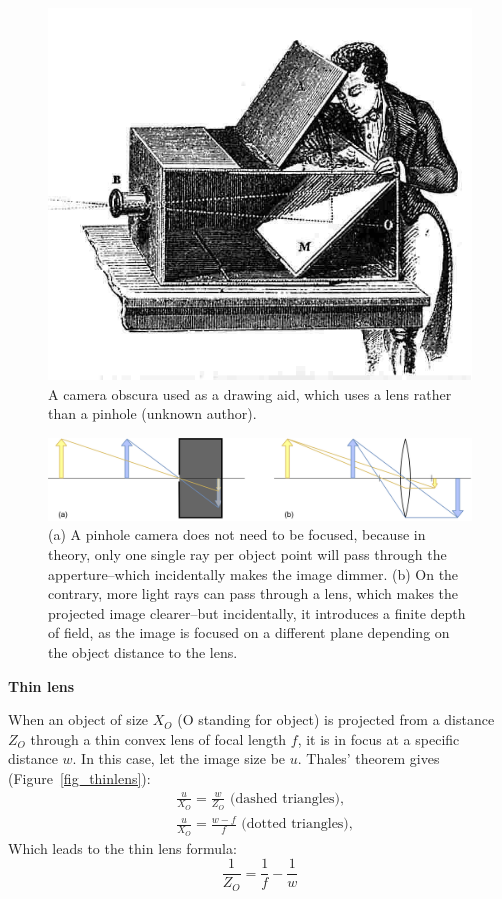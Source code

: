 \begin{figure}[hbtp]
	\centering
	\def\svgwidth{\columnwidth}
	\fontsize{10pt}{10pt}\selectfont
	\includegraphics[width=0.8\linewidth]{"../Chap2/Figures/Camera_Obscura.jpg"}
	\caption{A camera obscura used as a drawing aid, which uses a lens rather than a pinhole (unknown author). } 
	\label{fig_camobscura}
\end{figure}

\begin{figure}[hbtp]
	\centering
	\def\svgwidth{\columnwidth}
	\fontsize{10pt}{10pt}\selectfont
	\includegraphics[width=1\linewidth]{"../Chap2/Figures/Pinhole_Lens.png"}
	\caption{(a) A pinhole camera does not need to be focused, because in theory, only one single ray per object point will pass through the apperture--which incidentally makes the image dimmer. (b) On the contrary, more light rays can pass through a lens, which makes the projected image clearer--but incidentally, it introduces a finite depth of field, as the image is focused on a different plane depending on the object distance to the lens.} 
	\label{fig_pinholelens}
\end{figure}

\newpage
\noindent\textbf{Thin lens}

When an object of size \(X_O\) (O standing for object) is projected from a distance \(Z_O\) through a thin convex lens of focal length \(f\), it is in focus at a specific distance \(w\). In this case, let the image size be \(u\). Thales' theorem gives (Figure~\ref{fig_thinlens}):
\begin{equation}
  \begin{aligned}
  &\frac{u}{X_O} = \frac{w}{Z_O} \text{ (dashed triangles)},\\
  &\frac{u}{X_O} = \frac{w-f}{f} \text{ (dotted triangles)},
  \end{aligned}
\end{equation}
Which leads to the thin lens formula:
\begin{equation}
    \frac{1}{Z_O} = \frac{1}{f} - \frac{1}{w}
\end{equation}

